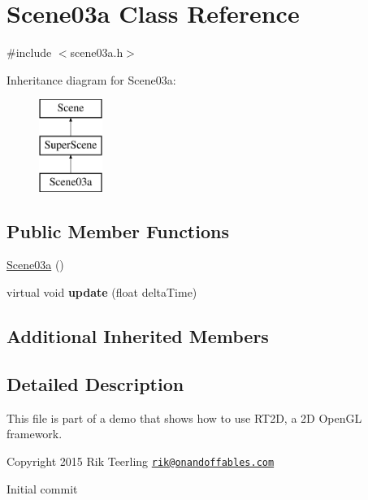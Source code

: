 \hypertarget{class_scene03a}{}\section{Scene03a Class Reference}
\label{class_scene03a}


{\ttfamily \#include $<$scene03a.\+h$>$}

Inheritance diagram for Scene03a\+:\begin{figure}[H]
\begin{center}
\leavevmode
\includegraphics[height=3.000000cm]{class_scene03a}
\end{center}
\end{figure}
\subsection*{Public Member Functions}
\begin{DoxyCompactItemize}
\item 
\hyperlink{class_scene03a_a51e76ff839b9e5aa276aee0a5ca1b137}{Scene03a} ()
\item 
\mbox{\label{class_scene03a_a96d705875f379a21b342358a3aa814a2}} 
virtual void {\bfseries update} (float delta\+Time)
\end{DoxyCompactItemize}
\subsection*{Additional Inherited Members}


\subsection{Detailed Description}
This file is part of a demo that shows how to use R\+T2D, a 2D Open\+GL framework.


\begin{DoxyItemize}
\item Copyright 2015 Rik Teerling \href{mailto:rik@onandoffables.com}{\tt rik@onandoffables.\+com}
\begin{DoxyItemize}
\item Initial commit 
\end{DoxyItemize}
\end{DoxyItemize}


